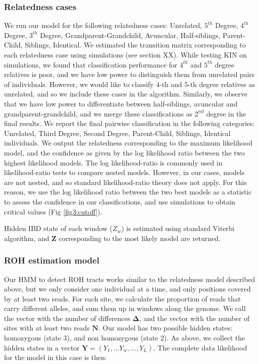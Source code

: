 \documentclass[12pt, letterpaper]{article}
\newcommand{\BZ}{\mathbf{Z}}
\begin{document}
\subsubsection{Relatedness cases}
We run our model for the following relatedness cases: Unrelated, $5^{th}$ Degree, $4^{th}$ Degree, $3^{th}$ Degree, Grandparent-Grandchild, Avuncular, Half-siblings, Parent-Child, Siblings, Identical.
We estimated the transition matrix corresponding to each relatedness case using simulations (see section XX). While testing KIN on simulations, we found that classification performance for $4^{th}$ and $5^{th}$ degree relatives is poor, and we have low power to distinguish them from unrelated pairs of individuals. However, we would like to classify 4-th and 5-th degree relatives as unrelated, and so we include these cases in the algorithm. Similarly, we observe that we have low power to differentiate between half-siblings, avuncular and grandparent-grandchild, and we merge these classifications as $2^{nd}$ degree in the final results. We report the final pairwise classification in the following categories: Unrelated, Third Degree, Second Degree, Parent-Child, Siblings, Identical individuals. We output the relatedness corresponding to the maximum likelihood model, and the confidence as given by the log likelihood ratio between the two highest likelihood models. The log likelihood-ratio is commonly used in likelihood-ratio tests to compare nested models. However, in our cases, models are not nested, and so standard likelihood-ratio theory does not apply. For this reason, we use the log likelihood ratio between the two best models as a statistic to assess the confidence in our classifications, and use simulations to obtain critical values (Fig \ref{fig3:cutoff}).

Hidden IBD state of each window ($Z_w$) is estimated using standard Viterbi algorithm, and $\BZ$ corresponding to the most likely model are returned. 

\subsubsection{ROH estimation model}
Our HMM to detect ROH tracts works similar to the relatedness model described above, but we only consider one individual at a time, and only positions covered by at least two reads. For each site, we calculate the proportion of reads that carry different alleles, and sum them up in windows along the genome. We call the vector with the number of differences $\mathbf{\Delta}$, and the vector with the number of sites with at least two reads $\mathbf{N}$.   Our model has two possible hidden states: homozygous (state $3$), and non homozygous (state $2$). As above, we collect the hidden states in a vector $\mathbf{Y} = (Y_1, \dots Y_w, \dots, Y_L)$. The complete data likelihood for the model in this case is then:
\end{document}
